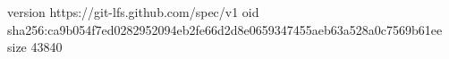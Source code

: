 version https://git-lfs.github.com/spec/v1
oid sha256:ca9b054f7ed0282952094eb2fe66d2d8e0659347455aeb63a528a0c7569b61ee
size 43840
